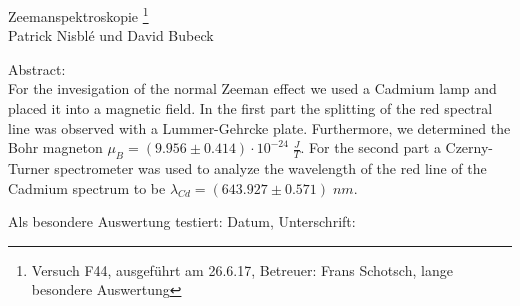 \thispagestyle{empty}
	\null\vspace{40mm}
	\begin{center}
		{
			\Large Zeemanspektroskopie
			\footnote{
				\noindent Versuch F44, ausgeführt am 26.6.17,
				Betreuer: Frans Schotsch,
				lange besondere Auswertung
			}
		}\\[15mm]
		Patrick Nisblé und David Bubeck

		\vspace{25mm}

		\parbox{0.9\textwidth}{
			Abstract:\\
			\small For the invesigation of the normal Zeeman effect we used a Cadmium lamp and placed it into a magnetic field. In the first part the splitting of the red spectral line was observed with a Lummer-Gehrcke plate. Furthermore, we determined the Bohr magneton $\mu_B = (9.956 \pm 0.414) \cdot 10^{-24} \; \frac{J}{T}$. For the second part a Czerny-Turner spectrometer was used to analyze the wavelength of the red line of the Cadmium spectrum to be $\lambda_{Cd} = (643.927 \pm 0.571) \; nm$. 
		}
	\end{center}

	\vfill
	Als besondere Auswertung testiert: Datum, Unterschrift:
	\vspace{20mm}
	\newpage
	\null\thispagestyle{empty}
